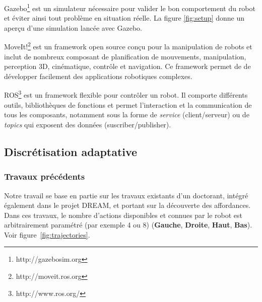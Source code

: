 \documentclass[draft]{llncs}
\begin{document}
Gazebo\footnote{http://gazebosim.org} est un simulateur nécessaire pour valider le bon comportement du robot et éviter ainsi tout problème en situation réelle.
La figure \ref{fig:setup} donne un aperçu d'une simulation lancée avec Gazebo.

MoveIt!\footnote{http://moveit.ros.org} est un framework open source conçu pour la manipulation de robots et inclut de nombreux composant de planification de mouvements, manipulation, perception 3D, cinématique, contrôle et navigation.
Ce framework permet de de développer facilement des applications robotiques complexes.

ROS\footnote{http://www.ros.org/} est un framework flexible pour contrôler un robot.
Il comporte différents outils, bibliothèques de fonctions et permet l'interaction et la communication de tous les composants, notamment sous la forme de \textit{service} (client/serveur) ou de \textit{topics} qui exposent des données (suscriber/publisher).









\subsection{Discrétisation adaptative}



\subsubsection{Travaux précédents}

Notre travail se base en partie sur les travaux existants d'un doctorant, intégré également dans le projet DREAM, et portant sur la découverte des affordances.
Dans ces travaux, le nombre d'actions disponibles et connues par le robot est arbitrairement paramétré (par exemple 4 ou 8) (\textbf{Gauche}, \textbf{Droite}, \textbf{Haut}, \textbf{Bas}). Voir figure~\ref{fig:trajectories}.
\end{document}
